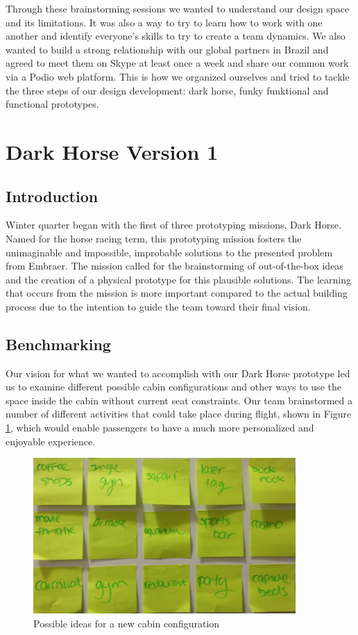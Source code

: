 Through these brainstorming sessions we wanted to understand our design space and its limitations. It was also a way to try to learn how to work with one another and identify everyone's skills to try to create a team dynamics. We also wanted to build a strong relationship with our global partners in Brazil and agreed to meet them on Skype at least once a week and share our common work via a Podio web platform. This is how we organized ourselves and tried to tackle the three steps of our design development: dark horse, funky funktional and functional prototypes. 

\section{Dark Horse Version 1}
\subsection{Introduction}
Winter quarter began with the first of three prototyping missions, Dark Horse.  Named for the horse racing term, this prototyping mission fosters the unimaginable and impossible, improbable solutions to the presented problem from Embraer.  The mission called for the brainstorming of out-of-the-box ideas and the  creation of a physical prototype for this plausible solutions.  The learning that occurs from the mission is more important compared to the actual building process due to the intention to guide the team toward their final vision. 

\subsection{Benchmarking}
Our vision for what we wanted to accomplish with our Dark Horse prototype led us to examine different possible cabin configurations and other ways to use the space inside the cabin without current seat constraints. Our team brainstormed a number of different activities that could take place during flight, shown in Figure \ref{fig:possible_themes.jpg}, which would enable passengers to have a much more personalized and enjoyable experience. 

\begin{figure}[h]
  \centering
     \includegraphics[width=10cm]{images/possible_themes.jpg}
   \caption{Possible ideas for a new cabin configuration}
  \label{fig:possible_themes.jpg}
\end{figure}

